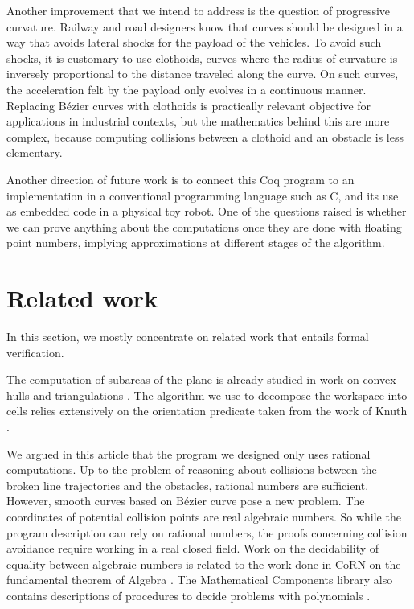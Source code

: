 \documentclass{easychair}
\begin{document}
Another improvement that we intend to address is the question of
progressive curvature.  Railway and road designers know that curves
should be designed in a way that avoids lateral shocks for the payload
of the vehicles.  To avoid such shocks, it is customary to use
clothoids, curves where the radius of curvature is inversely
proportional to the distance traveled along the curve.  On such
curves, the acceleration felt by the payload only evolves in a
continuous manner.  Replacing Bézier curves with clothoids is
practically relevant objective for applications in industrial
contexts, but the mathematics behind this are more complex, because
computing collisions between a clothoid and an obstacle is less elementary.

Another direction of future work is to connect this Coq program to an
implementation in a conventional programming language such as C, and
its use as embedded code in a physical toy robot.  One of the
questions raised is whether we can prove anything about the
computations once they are done with floating point numbers, implying
approximations at different stages of the algorithm.
\section{Related work}
In this section, we mostly concentrate on related work that entails formal
verification.

The computation of subareas of the plane is already studied in work
on convex hulls \cite{PichardieBertot01} and triangulations
\cite{DufourdBertot10,Bertot18}.  The algorithm we use to decompose
the workspace into cells relies extensively on the orientation
predicate taken from the work of Knuth \cite{KnuthAxiomsAndHulls}.

We argued in this article that the program we designed only uses
rational computations.  Up to the problem of reasoning about
collisions between the broken line trajectories and the obstacles,
rational numbers are sufficient.  However, smooth curves based on
Bézier curve pose a new problem.  The coordinates of potential
collision points are real algebraic numbers.  So while the program
description can rely on rational numbers, the proofs concerning
collision avoidance require working in a real closed field.  Work on
the decidability of equality between algebraic numbers is related to
the work done in CoRN on the fundamental theorem of Algebra
\cite{GeuversWZ00}.  The Mathematical Components library also contains
descriptions of procedures to decide problems with polynomials
\cite{CohenMQERCF}.
\end{document}

